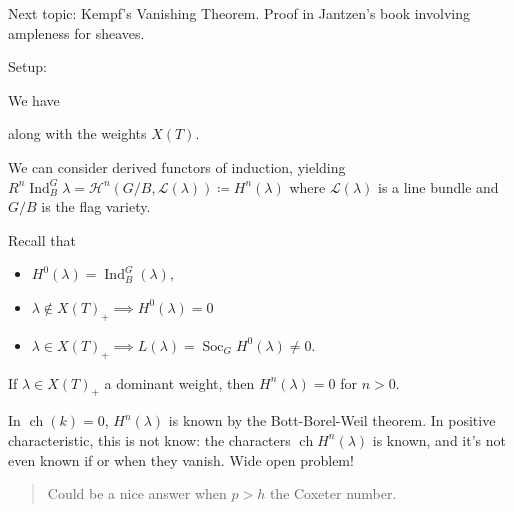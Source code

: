 Next topic: Kempf's Vanishing Theorem. Proof in Jantzen's book involving
ampleness for sheaves.

Setup:

We have

\begin{center}
\end{center}

along with the weights \(X(T)\).

We can consider derived functors of induction, yielding
\(R^n \operatorname{Ind}_B^G \lambda = \mathcal{H}^n(G/B, \mathcal{L}(\lambda)) \coloneqq H^n(\lambda)\)
where \(\mathcal{L}(\lambda)\) is a line bundle and \(G/B\) is the flag
variety.

Recall that

\begin{itemize}
\tightlist
\item
  \(H^0(\lambda) = \operatorname{Ind}_B^G(\lambda)\),
\item
  \(\lambda \not\in X(T)_+ \implies H^0(\lambda) = 0\)
\item
  \(\lambda \in X(T)_+ \implies L(\lambda) = \operatorname{Soc}_G H^0(\lambda) \neq 0\).
\end{itemize}

\begin{theorem}[Kempf]

If \(\lambda \in X(T)_+\) a dominant weight, then \(H^n(\lambda) = 0\)
for \(n> 0\).

\end{theorem}

\begin{remark}

In \(\operatorname{ch}(k) = 0\), \(H^n(\lambda)\) is known by the
Bott-Borel-Weil theorem. In positive characteristic, this is not know:
the characters \(\operatorname{ch}H^n (\lambda)\) is known, and it's not
even known if or when they vanish. Wide open problem!

\begin{quote}
Could be a nice answer when \(p>h\) the Coxeter number.
\end{quote}

\end{remark}

